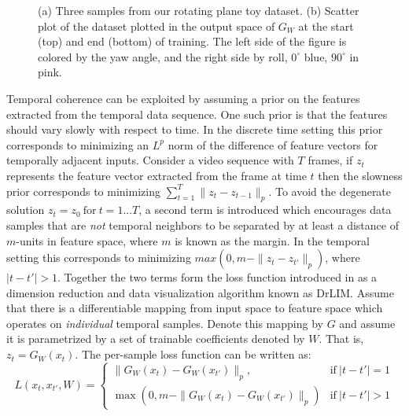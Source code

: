 \documentclass{article} %
\begin{document}
\begin{figure}
\caption{(a) Three samples from our rotating plane toy dataset. (b) Scatter plot of the dataset plotted in the output space of $G_W$ at the start (top) and end (bottom) of training. The left side of the figure is colored by the yaw angle, and the right side by roll, $0^{\circ}$  blue, $90^{\circ}$ in pink.}  
\end{figure} 
Temporal coherence can be exploited by assuming a prior on the features extracted from the temporal data sequence. One such prior is that the features should vary slowly with respect to time. In the discrete time setting this prior corresponds to minimizing an $L^p$ norm of the difference of feature vectors for temporally adjacent inputs. 
Consider a video sequence with $T$ frames, if $z_t$ represents the feature vector extracted from the frame at time $t$ then the slowness prior corresponds to minimizing $\sum_{t=1}^{T} \| z_t - z_{t-1} \|_p$. To avoid the degenerate solution $z_t = z_0 ~\mbox{for}~ t=1...T$, a second term is introduced which encourages data samples that are \emph{not} temporal neighbors to be separated by at least a distance of $m$-units in feature space, where $m$ is known as the margin. In the temporal setting this corresponds to minimizing $max(0,m-\|z_t - z_{t'}\|_p)$, where $|t-t'| > 1$. Together the two terms form the loss function introduced in \cite{DrLIM} as a dimension reduction and data visualization algorithm known as DrLIM. 
Assume that there is a differentiable mapping from input space to feature space which operates on \emph{individual} temporal samples. Denote this mapping by $G$ and assume it is parametrized by a set of trainable coefficients denoted by $W$. That is, $z_t = G_W(x_t)$. The per-sample loss function can be written as: 
\begin{equation} 
\label{eqn:drlimcrit}
L(x_t,x_{t'},W)=\left\{
                \begin{array}{ll}
                 \|G_W(x_t) - G_W(x_{t'})\|_p, &\text{if}~|t-t'| = 1  \\
                 \max(0,m-\|G_W(x_t) - G_W(x_{t'})\|_p) &\text{if}~|t-t'| > 1
                \end{array}
              \right.
\end{equation} 
\end{document}
